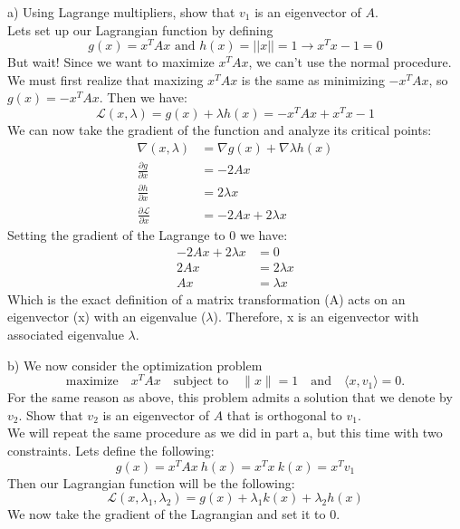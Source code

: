 \documentclass[12pt,twoside]{article}
\newcommand{\sT}{T}
\newcommand{\Lagr}{\mathcal{L}}
\begin{document}
a) Using Lagrange multipliers, show that $v_1$ is an eigenvector of $A$.\\
Lets set up our Lagrangian function by defining 
$$
g(x) = x^TAx \text{ and } h(x) = ||x|| = 1 \rightarrow x^Tx - 1 = 0$$
But wait! Since we want to maximize $x^TAx$, we can't use the normal procedure. We must first realize that maxizing $x^TAx$ is the same as minimizing $-x^TAx$, so $g(x) = -x^TAx$.
Then we have:
$$
    \Lagr (x,\lambda) = g(x) + \lambda h(x) = -x^TAx + x^Tx - 1
$$
We can now take the gradient of the function and analyze its critical points:
\begin{equation}
    \begin{split}
    \nabla (x, \lambda) &= \nabla g(x) + \nabla \lambda h(x)   \\
    \frac{\partial g}{\partial x} &= -2Ax \\
    \frac{\partial h}{\partial x} &= 2\lambda x \\
    \frac{\partial \Lagr}{\partial x} &= -2Ax + 2\lambda x 
    \end{split}
\end{equation}
Setting the gradient of the Lagrange to 0 we have:
\begin{equation}
    \begin{split}
        -2Ax + 2\lambda x &= 0 \\
        2Ax &= 2\lambda x \\
        Ax &= \lambda x
    \end{split}
\end{equation}
Which is the exact definition of a matrix transformation (A) acts on an eigenvector (x) with an eigenvalue ($\lambda$). Therefore, x is an eigenvector with associated eigenvalue $\lambda$.

\newpage

b) We now consider the optimization problem
	\begin{equation}
		\text{maximize} \quad x^{\sT} A x \quad \text{subject to} \quad \|x\| = 1
		\quad \text{and} \quad \langle x,v_1 \rangle = 0.
	\end{equation}
	For the same reason as above, this problem admits a solution that we denote by $v_2$. Show that $v_2$ is an eigenvector of $A$ that is orthogonal to $v_1$.\\
We will repeat the same procedure as we did in part a, but this time with two constraints. Lets define the following:
$$
    g(x) = x^TAx \ h(x) = x^Tx \ k(x) = x^Tv_1
$$
Then our Lagrangian function will be the following:
$$
    \Lagr (x,\lambda_1, \lambda_2) = g(x) + \lambda_1 k(x) + \lambda_2 h(x) 
$$
We now take the gradient of the Lagrangian and set it to 0.
\end{document}
